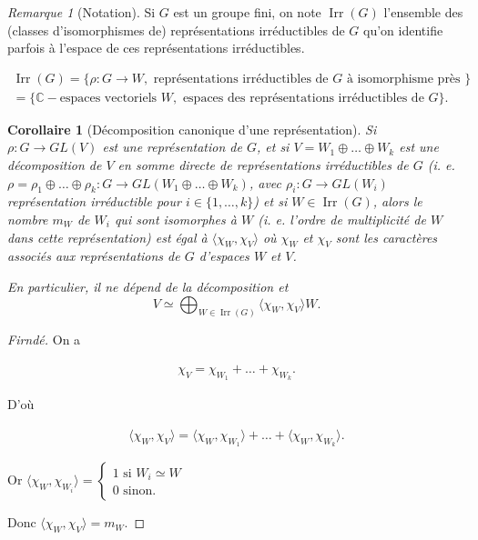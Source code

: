 \documentclass[french]{book}
\newtheorem{protocorollary}{Corollaire}
\newenvironment{corollary}
    {\colorlet{shadecolor}{violet!10}\begin{shaded}\begin{protocorollary}}
    {\end{protocorollary}\end{shaded}}
\theoremstyle{definition}
\theoremstyle{remark}
\newtheorem*{remark}{Remarque}
\begin{document}
\begin{remark}[Notation]
  Si \(G\) est un groupe fini, on note \(\operatorname{Irr}(G)\) l'ensemble des (classes d'isomorphismes de) représentations irréductibles de \(G\) qu'on identifie parfois à l'espace de ces représentations irréductibles.

  \begin{gather*}
    \operatorname{Irr}(G) = \{ \rho : G \longrightarrow W, \text{ représentations irréductibles de } G \text{ à isomorphisme près } \}\\
     = \{ \mathbb{C}-\text{espaces vectoriels } W, \text{ espaces des représentations irréductibles de } G \}.
  \end{gather*}
\end{remark}

\begin{corollary}[Décomposition canonique d'une représentation]\label{cor2}
  Si \(\rho : G \longrightarrow GL(V)\) est une représentation de \(G\), et si \(V = W_1 \oplus \dots \oplus W_k\) est une décomposition de \(V\) en somme directe de représentations irréductibles de \(G\) (i. e. \(\rho = \rho_1 \oplus \dots \oplus \rho_k : G \longrightarrow GL(W_1 \oplus \dots \oplus W_k)\), avec \(\rho_i : G \longrightarrow GL(W_i)\) représentation irréductible pour \(i \in \{ 1, \dots, k \}\)) et si \(W \in \operatorname{Irr}(G)\), alors le nombre \(m_W\) de \(W_i\) qui sont isomorphes à \(W\) (i. e. l'ordre de multiplicité de \(W\) dans cette représentation) est égal à \(\langle \chi_W, \chi_V \rangle \) où \(\chi_W\) et \(\chi_V\) sont les caractères associés aux représentations de \(G\) d'espaces \(W\) et \(V\).

  En particulier, il ne dépend de la décomposition et \[V \simeq \bigoplus _{W \in \operatorname{Irr}(G)} \langle \chi_W, \chi_V \rangle W.\]
\end{corollary}

\begin{proof}[Firndé]
  On a

  \begin{gather*}
    \chi_V = \chi _{W_1} + \dots + \chi _{W_k}.
  \end{gather*}

  D'où

  \begin{gather*}
    \langle \chi _{W}, \chi_V \rangle = \langle \chi_W, \chi _{W_1} \rangle + \dots + \langle \chi_W, \chi _{W_k} \rangle.
  \end{gather*}

  Or \(\langle \chi_W, \chi _{W_i} \rangle = \begin{cases}
    1 \text{ si } W_i \simeq W \\
    0 \text{ sinon. }
  \end{cases} \)

  Donc \(\langle \chi_W, \chi_V \rangle = m_W\).
\end{proof}
\end{document}
